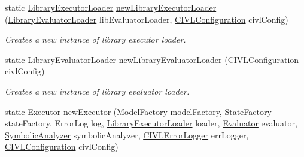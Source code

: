 \begin{DoxyCompactItemize}
\item 
static \hyperlink{interfaceedu_1_1udel_1_1cis_1_1vsl_1_1civl_1_1semantics_1_1IF_1_1LibraryExecutorLoader}{Library\+Executor\+Loader} \hyperlink{classedu_1_1udel_1_1cis_1_1vsl_1_1civl_1_1semantics_1_1IF_1_1Semantics_a544f0f9539940b5f76e9f0bd90a74931}{new\+Library\+Executor\+Loader} (\hyperlink{interfaceedu_1_1udel_1_1cis_1_1vsl_1_1civl_1_1semantics_1_1IF_1_1LibraryEvaluatorLoader}{Library\+Evaluator\+Loader} lib\+Evaluator\+Loader, \hyperlink{classedu_1_1udel_1_1cis_1_1vsl_1_1civl_1_1config_1_1IF_1_1CIVLConfiguration}{C\+I\+V\+L\+Configuration} civl\+Config)
\begin{DoxyCompactList}\small\item\em Creates a new instance of library executor loader. \end{DoxyCompactList}\item 
static \hyperlink{interfaceedu_1_1udel_1_1cis_1_1vsl_1_1civl_1_1semantics_1_1IF_1_1LibraryEvaluatorLoader}{Library\+Evaluator\+Loader} \hyperlink{classedu_1_1udel_1_1cis_1_1vsl_1_1civl_1_1semantics_1_1IF_1_1Semantics_a3252aa264945a2298365543fdb306577}{new\+Library\+Evaluator\+Loader} (\hyperlink{classedu_1_1udel_1_1cis_1_1vsl_1_1civl_1_1config_1_1IF_1_1CIVLConfiguration}{C\+I\+V\+L\+Configuration} civl\+Config)
\begin{DoxyCompactList}\small\item\em Creates a new instance of library evaluator loader. \end{DoxyCompactList}\item 
static \hyperlink{interfaceedu_1_1udel_1_1cis_1_1vsl_1_1civl_1_1semantics_1_1IF_1_1Executor}{Executor} \hyperlink{classedu_1_1udel_1_1cis_1_1vsl_1_1civl_1_1semantics_1_1IF_1_1Semantics_a410f143cf8c954a4a521c8488f8c9f00}{new\+Executor} (\hyperlink{interfaceedu_1_1udel_1_1cis_1_1vsl_1_1civl_1_1model_1_1IF_1_1ModelFactory}{Model\+Factory} model\+Factory, \hyperlink{interfaceedu_1_1udel_1_1cis_1_1vsl_1_1civl_1_1state_1_1IF_1_1StateFactory}{State\+Factory} state\+Factory, Error\+Log log, \hyperlink{interfaceedu_1_1udel_1_1cis_1_1vsl_1_1civl_1_1semantics_1_1IF_1_1LibraryExecutorLoader}{Library\+Executor\+Loader} loader, \hyperlink{interfaceedu_1_1udel_1_1cis_1_1vsl_1_1civl_1_1semantics_1_1IF_1_1Evaluator}{Evaluator} evaluator, \hyperlink{interfaceedu_1_1udel_1_1cis_1_1vsl_1_1civl_1_1semantics_1_1IF_1_1SymbolicAnalyzer}{Symbolic\+Analyzer} symbolic\+Analyzer, \hyperlink{classedu_1_1udel_1_1cis_1_1vsl_1_1civl_1_1log_1_1IF_1_1CIVLErrorLogger}{C\+I\+V\+L\+Error\+Logger} err\+Logger, \hyperlink{classedu_1_1udel_1_1cis_1_1vsl_1_1civl_1_1config_1_1IF_1_1CIVLConfiguration}{C\+I\+V\+L\+Configuration} civl\+Config)

\end{DoxyCompactItemize}
